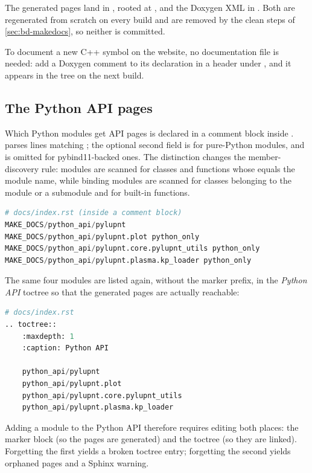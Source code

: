 The generated pages land in , rooted at
, and the Doxygen XML in
. Both are regenerated from scratch on every
build and are removed by the clean steps of \cref{sec:bd-makedocs}, so neither
is committed.

To document a new C++ symbol on the website, no documentation file is needed:
add a Doxygen comment to its declaration in a header under ,
and it appears in the tree on the next build.

\subsection{The Python API pages}
\label{sec:bd-pythonapi}

Which Python modules get API pages is declared in a comment block inside
.  parses lines matching
; the optional second field is
 for pure-Python modules, and is omitted for
pybind11-backed ones. The distinction changes the member-discovery rule:
 modules are scanned for classes and functions whose
 equals the module name, while binding modules are scanned
for classes belonging to the module or a submodule and for built-in functions.

\begin{lstlisting}[language=py]
# docs/index.rst (inside a comment block)
MAKE_DOCS/python_api/pylupnt
MAKE_DOCS/python_api/pylupnt.plot python_only
MAKE_DOCS/python_api/pylupnt.core.pylupnt_utils python_only
MAKE_DOCS/python_api/pylupnt.plasma.kp_loader python_only
\end{lstlisting}

The same four modules are listed again, without the marker prefix, in the
\emph{Python API} toctree so that the generated pages are actually reachable:

\begin{lstlisting}[language=py]
# docs/index.rst
.. toctree::
    :maxdepth: 1
    :caption: Python API

    python_api/pylupnt
    python_api/pylupnt.plot
    python_api/pylupnt.core.pylupnt_utils
    python_api/pylupnt.plasma.kp_loader
\end{lstlisting}

Adding a module to the Python API therefore requires editing both places: the
marker block (so the pages are generated) and the toctree (so they are linked).
Forgetting the first yields a broken toctree entry; forgetting the second
yields orphaned pages and a Sphinx warning.

